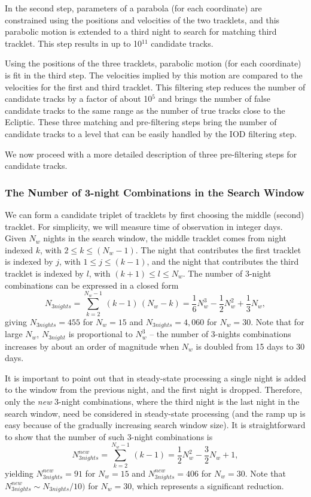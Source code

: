 In the second step, parameters of a parabola (for each coordinate) are constrained using the
positions and velocities of the two tracklets, and this parabolic motion is extended to a third
night to search for matching third tracklet. This step results in up to 10$^{11}$ candidate
tracks.

Using the positions of the three tracklets, parabolic motion (for each coordinate) is fit
in the third step. The velocities implied by this motion are compared to the velocities for
the first and third tracklet. This filtering step reduces the number of candidate tracks
by a factor of about 10$^{5}$ and brings the number of false candidate tracks to
the same range as the number of true tracks close to the Ecliptic. These three matching
and pre-filtering steps bring the number of candidate tracks to a level that
can be easily handled by the IOD filtering step.

We now proceed with a more detailed description of three pre-filtering steps
for candidate tracks.

\subsubsection{The Number of 3-night Combinations in the Search Window}

We can form a candidate triplet of tracklets by first choosing the middle (second) tracklet.
For simplicity, we will measure time of observation in integer days. Given $N_w$ nights
in the search window, the middle tracklet comes from night indexed $k$, with
$2 \le k \le (N_w-1)$. The night that contributes the first tracklet is indexed by $j$,
with $1 \le j \le (k-1)$, and the night that contributes the third tracklet is indexed by $l$,
with $(k+1) \le l \le N_w$. The number of 3-night combinations can be expressed in a closed
form
\begin{equation}
\label{eq:N3}
  N_{3nights} = \sum_{k=2}^{N_w-1} \, (k-1)\, (N_w-k) =\frac{1}{6}N_w^3 - \frac{1}{2}N_w^2 + \frac{1}{3}N_w,
\end{equation}
giving $N_{3nights} = 455$ for $N_w=15$ and $N_{3nights} = 4,060$ for $N_w=30$.  Note
that for large $N_w$, $N_{3night}$ is proportional to $N_w^3$ -- the number of 3-nights
combinations increases by about an order of magnitude when $N_w$ is doubled from
15 days to 30 days.

It is important to point out that in steady-state processing a single night is added to the
window from the previous night, and the first night is dropped. Therefore, only the {\it new}
3-night combinations, where the third night is the last night in the search window, need
be considered in steady-state processing (and the ramp up is easy because of the gradually
increasing search window size). It is straightforward to show that the number of such
3-night combinations is
\begin{equation}
\label{eq:N3n}
  N_{3nights}^{new} = \sum_{k=2}^{N_w-1} \, (k-1) =\frac{1}{2}N_w^2 - \frac{3}{2}N_w + 1,
\end{equation}
yielding $N_{3nights}^{new} = 91$ for $N_w=15$ and $N_{3nights}^{new} = 406$ for $N_w=30$.
Note that $N_{3nights}^{new} \sim N_{3nights} / 10)$ for $N_w=30$, which represents
a significant reduction.



